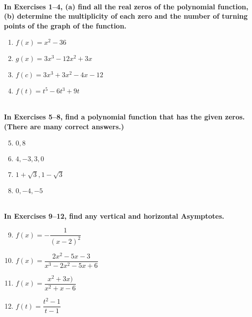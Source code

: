 \begin{exercise}
    ~\\\-\hspace{0.3cm} \textbf{
        In Exercises 1–4, (a) find all the real zeros of the polynomial function, (b) determine the multiplicity of each zero and the number of turning points of the graph of the function.
    }\cite{ci}\\
    \begin{enumerate} 
		\item $f(x) = x^2-36$
		\item $g(x) = 3x^3-12x^2+3x$
		\item $f(c) = 3x^3+3x^2-4x-12$
		\item $f(t) = t^5-6t^3+9t$
    \end{enumerate}
    ~\\\-\hspace{0.3cm} \textbf{
        In Exercises 5–8, find a polynomial function that has the given zeros. (There are many correct answers.)
    }\cite{ci}\\
    \begin{enumerate}
        \setcounter{enumi}{4}
        \item $0,8$
        \item $4,-3,3,0$
        \item $1+\sqrt{3}, 1-\sqrt{3}$
        \item $0, -4, -5$
    \end{enumerate}
    ~\\\-\hspace{0.3cm} \textbf{
        In Exercises 9–12, find any vertical and horizontal Asymptotes.
    }\cite{ci}\\
    \begin{enumerate}
        \setcounter{enumi}{8}
        \item $f(x)=-\dfrac{1}{(x-2)^2}$
        \item $f(x) = \dfrac{2x^2-5x-3}{x^3-2x^2-5x+6}$
        \item $f(x) = \dfrac{x^2+3x)}{x^2+x-6}$
        \item $f(t) = \dfrac{t^2-1}{t-1}$
    \end{enumerate}
\end{exercise}
